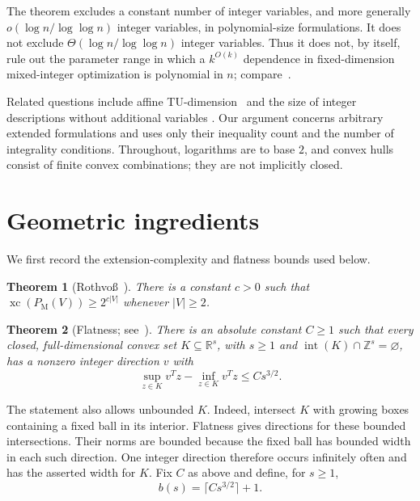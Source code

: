 \documentclass[11pt]{article}
\newtheorem{theorem}{Theorem}
\theoremstyle{definition}
\DeclareMathOperator{\intr}{int}
\DeclareMathOperator{\xc}{xc}
\newcommand{\R}{\mathbb R}
\newcommand{\Z}{\mathbb Z}
\newcommand{\PM}{P_{\mathrm M}}
\begin{document}
The theorem excludes a constant number of integer variables, and more generally
$o(\log n/\log\log n)$ integer variables, in polynomial-size formulations.
It does not exclude $\Theta(\log n/\log\log n)$ integer variables.
Thus it does not, by itself, rule out the parameter range in which a
$k^{O(k)}$ dependence in fixed-dimension mixed-integer optimization is
polynomial in $n$; compare~\cite{lenstra_integer_1983}.

Related questions include affine TU-dimension~\cite{bader_2016_mixed} and
the size of integer descriptions without additional variables
\cite{kaibel_2015_lower}. Our argument concerns arbitrary extended
formulations and uses only their inequality count and the number of
integrality conditions. Throughout, logarithms are to base $2$, and convex
hulls consist of finite convex combinations; they are not implicitly closed.

\section{Geometric ingredients}\label{sec:ingredients}

We first record the extension-complexity and flatness bounds used below.

\begin{theorem}[Rothvo\ss~\cite{rothvoss_2014_matching}]\label{thm:rothvoss}
There is a constant $c>0$ such that
$\xc(\PM(V))\geq 2^{c|V|}$ whenever $|V|\geq2$.
\end{theorem}

\begin{theorem}[Flatness; see~\cite{Khinchin1948,Banaszczyk1999}]\label{thm:flatness}
There is an absolute constant $C\geq1$ such that every closed,
full-dimensional convex set $K\subseteq\R^s$, with $s\geq1$ and
$\intr(K)\cap\Z^s=\varnothing$, has a nonzero integer direction $v$ with
\[
 \sup_{z\in K}v^Tz-\inf_{z\in K}v^Tz\leq Cs^{3/2}.
\]
\end{theorem}

The statement also allows unbounded $K$. Indeed, intersect $K$ with growing
boxes containing a fixed ball in its interior. Flatness gives directions for
these bounded intersections. Their norms are bounded because the fixed ball
has bounded width in each such direction. One integer direction therefore
occurs infinitely often and has the asserted width for $K$.
Fix $C$ as above and define, for $s\geq1$,
\begin{equation}\label{eq:branching}
 b(s)=\lceil Cs^{3/2}\rceil+1.
\end{equation}
\end{document}
